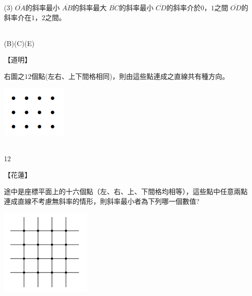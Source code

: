 \documentclass
[answers]
{exam}
\newcommand\ul[1]{\uline{\hspace*{#1}}}
\theoremstyle{definition}
\begin{document}
\begin{questions}
\begin{tasks}(3)
	\task $\overline{OA}$的斜率最小
	\task $\overline{AB}$的斜率最大
	\task $\overline{BC}$的斜率最小
	\task $\overline{CD}$的斜率介於$0$，$1$之間
	\task $\overline{OD}$的斜率介在$1$，$2$之間。
\end{tasks}
\begin{solution}~\\
	(B)(C)(E)
\end{solution}


\question
【道明】\\
\begin{minipage}[t]{0.7\linewidth}
	右圖之$12$個點(左右、上下間格相同)，則由這些點連成之直線共有\ul{50pt}種方向。
\end{minipage}
\hfill
\begin{minipage}[t]{0.3\linewidth}
	\vspace*{-0.3cm}
	\includegraphics[scale=1]{./figure/5.png}
	\raggedleft %
\end{minipage}

\begin{solution}~\\
	12
\end{solution}


\question
【花蓮】\\
\begin{minipage}[t]{0.7\linewidth}
	途中是座標平面上的十六個點（左、右、上、下間格均相等），這些點中任意兩點連成直線不考慮無斜率的情形，則斜率最小者為下列哪一個數值?
\end{minipage}
\hfill
\begin{minipage}[t]{0.3\linewidth}
	\vspace*{-0.3cm}
	\includegraphics[scale=1]{./figure/6.png}
	\raggedleft %
\end{minipage}


\end{questions}
\end{document}
